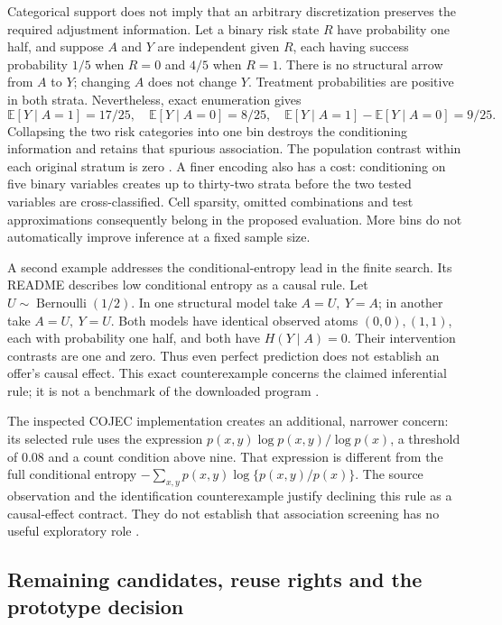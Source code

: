 Categorical support does not imply that an arbitrary discretization preserves
the required adjustment information. Let a binary risk state \(R\) have
probability one half, and suppose \(A\) and \(Y\) are independent given \(R\),
each having success probability \(1/5\) when \(R=0\) and \(4/5\) when
\(R=1\). There is no structural arrow from \(A\) to \(Y\); changing \(A\)
does not change \(Y\). Treatment probabilities are positive in both strata.
Nevertheless, exact enumeration gives
\[
 \mathbb E[Y\mid A=1]=17/25,\quad
 \mathbb E[Y\mid A=0]=8/25,\quad
 \mathbb E[Y\mid A=1]-\mathbb E[Y\mid A=0]=9/25.
\]
Collapsing the two risk categories into one bin destroys the conditioning
information and retains that spurious association. The population contrast
within each original stratum is zero \citep{exec13_cxx_examples}. A finer
encoding also has a cost: conditioning on five binary variables creates up
to thirty-two strata before the two tested variables are cross-classified.
Cell sparsity, omitted combinations and test approximations consequently
belong in the proposed evaluation. More bins do not automatically improve
inference at a fixed sample size.

A second example addresses the conditional-entropy lead in the finite search.
Its README describes low conditional entropy as a causal rule. Let
\(U\sim\operatorname{Bernoulli}(1/2)\). In one structural model take
\(A=U,\ Y=A\); in another take \(A=U,\ Y=U\). Both models have identical
observed atoms \((0,0),(1,1)\), each with probability one half, and both have
\(H(Y\mid A)=0\). Their intervention contrasts are one and zero. Thus even
perfect prediction does not establish an offer's causal effect. This exact
counterexample concerns the claimed inferential rule; it is not a benchmark
of the downloaded program \citep{exec13_cxx_examples,exec13_cxx_other_leads}.

The inspected COJEC implementation creates an additional, narrower concern:
its selected rule uses the expression
\(p(x,y)\log p(x,y)/\log p(x)\), a threshold of \(0.08\) and a count condition
above nine. That expression is different from the full conditional entropy
\(-\sum_{x,y}p(x,y)\log\{p(x,y)/p(x)\}\). The source observation and the
identification counterexample justify declining this rule as a causal-effect
contract. They do not establish that association screening has no useful
exploratory role \citep{exec13_cxx_other_leads}.

\subsection{Remaining candidates, reuse rights and the prototype decision}

